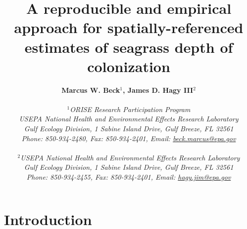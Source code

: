 \documentclass[letterpaper,12pt,oneside]{article}\usepackage[]{graphicx}\usepackage[]{color}
\begin{document}
\raggedbottom
\linenumbers
\raggedright
{}
\setlength{\parindent}{0.5in}
\renewcommand\refname{References \vspace{12pt}}

\begin{singlespace}
\title{{\bf {\Large A reproducible and empirical approach for spatially-referenced estimates of seagrass depth of colonization}}}
\author{
  {\bf {\normalsize Marcus W. Beck$^1$, James D. Hagy III$^2$}}
  \\\\{\textit {\normalsize $^1$ORISE Research Participation Program}}
  \\{\textit {\normalsize USEPA National Health and Environmental Effects Research Laboratory}}
  \\{\textit {\normalsize Gulf Ecology Division, 1 Sabine Island Drive, Gulf Breeze, FL 32561}}
	\\{\textit {\normalsize Phone: 850-934-2480, Fax: 850-934-2401, Email: \href{mailto:beck.marcus@epa.gov}{beck.marcus@epa.gov}}}
  \\\\{\textit {\normalsize $^2$USEPA National Health and Environmental Effects Research Laboratory}}
	\\{\textit {\normalsize Gulf Ecology Division, 1 Sabine Island Drive, Gulf Breeze, FL 32561}}
	\\{\textit {\normalsize Phone: 850-934-2455, Fax: 850-934-2401, Email: \href{mailto:hagy.jim@epa.gov}{hagy.jim@epa.gov}}}
	}
\date{}
\maketitle
\end{singlespace}
\clearpage

\section{Introduction}
\end{document}
